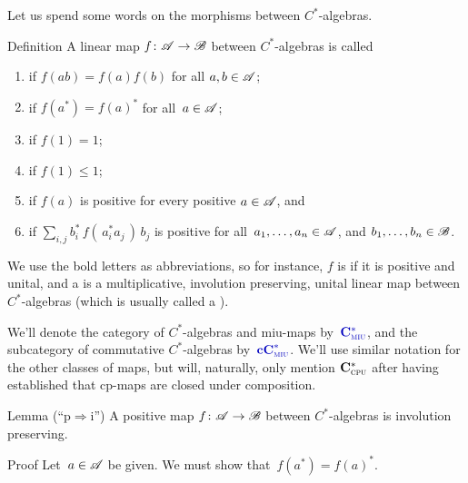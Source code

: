 \documentclass[a]{subfiles}
\begin{document}
\begin{parsec}%
\begin{point}%
Let us spend some words
on the morphisms between $C^*$-algebras.
\end{point}
\begin{point}[maps]{Definition}
A linear map $f\colon \mathscr{A} \to \mathscr{B}$
between $C^*$-algebras
is called
\begin{enumerate}
\item
{}%
if $f(ab)=f(a)f(b)$ for all $a,b\in\mathscr{A}$;
\item
{}%
if $f(a^*)=f(a)^*$ for all~$a\in\mathscr{A}$;
\item
{}%
if $f(1)=1$;
\item
{}%
if $f(1)\leq 1$;
\item
{}%
if $f(a)$ is positive
for every positive $a\in\mathscr{A}$, and
\item
{}%
%
if $\sum_{i,j} b_i^*\,f(\,a_i^*a_j\,)\,b_j$ is positive
for all~$a_1,\dotsc,a_n\in \mathscr{A}$, and $b_1,\dotsc,b_n\in\mathscr{B}$.
\end{enumerate}
\begin{point}%
We use the bold letters as abbreviations,
so for instance,
$f$ is %
 if it is positive and unital,
and a %
is a multiplicative, involution preserving,
unital linear map between $C^*$-algebras
(which is usually called a %
).

We'll denote the category of $C^*$-algebras
and miu-maps by~$\Define{\Cstar{miu}}$,%
and
the subcategory of commutative $C^*$-algebras
by~$\Define{\cCstar{miu}}$.%
We'll use similar notation
for the other classes of maps,
but
will,
naturally, only mention $\mathbf{C}^*_{\text{\textsc{cpu}}}$
after having established that cp-maps are closed under composition.
\end{point}
\end{point}
\begin{point}{Lemma (``p$\Rightarrow$i'')}
A positive map $f\colon \mathscr{A}\to\mathscr{B}$ between
$C^*$-algebras is involution preserving.
\begin{point}{Proof}%
Let~$a\in \mathscr{A}$ be given. We must show that~$f(a^*)=f(a)^*$.


\end{point}
\end{point}
\end{parsec}
\end{document}
